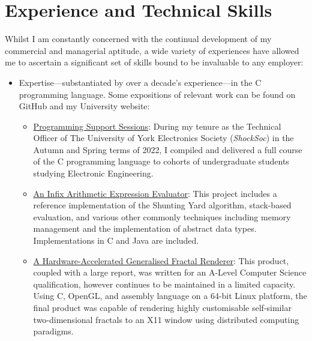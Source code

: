 \documentclass{article}
\newcommand{\githublink}[2]{\href{https://github.com/oliverdixon/#1}{#2}}
\newcommand{\weblink}[2]{\href{https://www-users.york.ac.uk/~od641/#1}{#2}}
\begin{document}
\section{Experience and Technical Skills}
Whilst I am constantly concerned with the continual development of my commercial
and managerial aptitude, a wide variety of experiences have allowed me to
ascertain a significant set of skills bound to be invaluable to any employer:
\begin{itemize}
        \item Expertise---substantiated by over a decade's experience---in the C
        programming language. Some expositions of relevant work can be found on
        GitHub and my University website:
        \begin{itemize}
                \item \weblink{pss}{Programming Support Sessions}: During my
                tenure as the Technical Officer of The University of York
                Electronics Society (\textit{ShockSoc}) in the Autumn and Spring
                terms of 2022, I compiled and delivered a full course of the C
                programming language to cohorts of undergraduate students
                studying Electronic Engineering.

                \item \githublink{calculator-demo}{An Infix Arithmetic
                Expression Evaluator}: This project includes a reference
                implementation of the Shunting Yard algorithm, stack-based
                evaluation, and various other commonly techniques including
                memory management and the implementation of abstract data types.
                Implementations in C and Java are included.

                \item \weblink{fractal}{A Hardware-Accelerated Generalised
                Fractal Renderer}: This product, coupled with a large report,
                was written for an A-Level Computer Science qualification,
                however continues to be maintained in a limited capacity. Using
                C, OpenGL, and assembly language on a 64-bit Linux platform, the
                final product was capable of rendering highly customisable
                self-similar two-dimensional fractals to an X11 window using
                distributed computing paradigms.


\end{itemize}
\end{itemize}
\end{document}
